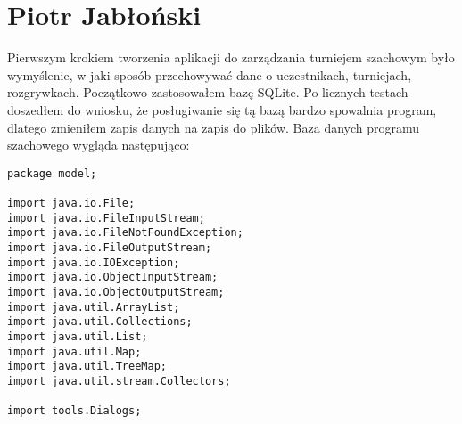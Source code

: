 \chapter{Piotr Jabłoński}
	Pierwszym krokiem tworzenia aplikacji do zarządzania turniejem szachowym było wymyślenie, w jaki sposób przechowywać dane o uczestnikach, turniejach, rozgrywkach. Początkowo zastosowałem bazę SQLite. Po licznych testach doszedłem do wniosku, że posługiwanie się tą bazą bardzo spowalnia program, dlatego zmieniłem zapis danych na zapis do plików. Baza danych programu szachowego wygląda następująco:
\begin{verbatim}
package model;

import java.io.File;
import java.io.FileInputStream;
import java.io.FileNotFoundException;
import java.io.FileOutputStream;
import java.io.IOException;
import java.io.ObjectInputStream;
import java.io.ObjectOutputStream;
import java.util.ArrayList;
import java.util.Collections;
import java.util.List;
import java.util.Map;
import java.util.TreeMap;
import java.util.stream.Collectors;

import tools.Dialogs;


\end{verbatim}
